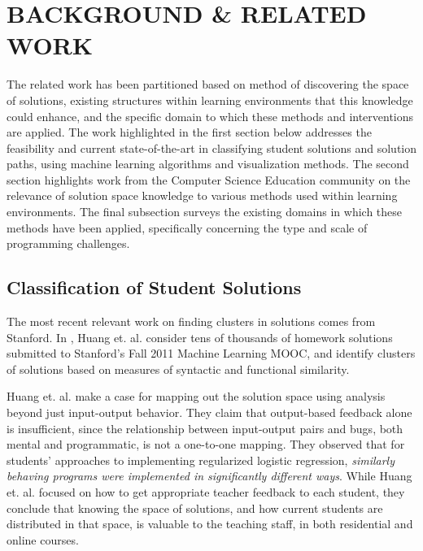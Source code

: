 \documentclass[12pt]{article}
\begin{document}
\section{BACKGROUND \& RELATED WORK}

The related work has been partitioned based on method of discovering the space of solutions, existing structures within learning environments that this knowledge could enhance, and the specific domain to which these methods and interventions are applied. The work highlighted in the first section below addresses the feasibility and current state-of-the-art in classifying student solutions and solution paths, using machine learning algorithms and visualization methods. The second section highlights work from the Computer Science Education community on the relevance of solution space knowledge to various methods used within learning environments. The final subsection surveys the existing domains in which these methods have been applied, specifically concerning the type and scale of programming challenges.

\subsection{Classification of Student Solutions}

The most recent relevant work on finding clusters in solutions comes from Stanford. In \cite{MOOCshop}, Huang et. al. consider tens of thousands of homework solutions submitted to Stanford’s Fall 2011 Machine Learning MOOC, and identify clusters of solutions based on measures of syntactic and functional similarity. 

Huang et. al. \cite{MOOCshop} make a case for mapping out the solution space using analysis beyond just input-output behavior. They claim that output-based feedback alone is insufficient, since the relationship between input-output pairs and bugs, both mental and programmatic, is not a one-to-one mapping.  They observed that for students' approaches to implementing regularized logistic regression, {\em similarly behaving programs were implemented in significantly different ways}. While Huang et. al. focused on how to get appropriate teacher feedback to each student, they conclude that knowing the space of solutions, and how current students are distributed in that space, is valuable to the teaching staff, in both residential and online courses. 

\end{document}
